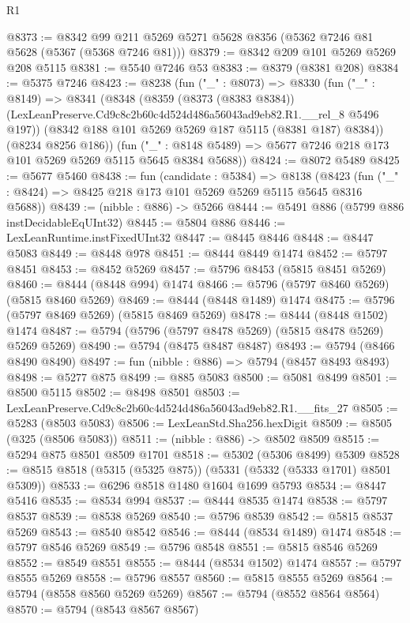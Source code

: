 \begin{lexlean}{R1}
\begin{coremodule}
@8373 := @8342 @99 @211 @5269 @5271 @5628 @8356 (@5362 @7246 @81 @5628 (@5367 (@5368 @7246 @81)))
@8379 := @8342 @209 @101 @5269 @5269 @208 @5115
@8381 := @5540 @7246 @53
@8383 := @8379 (@8381 @208)
@8384 := @5375 @7246
@8423 := @8238
    (fun ("_" : @8073) =>
    @8330
      (fun ("_" : @8149) =>
      @8341
        (@8348
          (@8359
            (@8373 (@8383 @8384))
            (LexLeanPreserve.Cd9c8c2b60c4d524d486a56043ad9eb82.R1.__rel_8 @5496 @197))
          (@8342 @188 @101 @5269 @5269 @187 @5115 (@8381 @187) @8384))
        (@8234 @8256 @186))
      (fun ("_" : @8148 @5489) => @5677 @7246 @218 @173 @101 @5269 @5269 @5115 @5645 @8384 @5688))
@8424 := @8072 @5489
@8425 := @5677 @5460
@8438 := fun (candidate : @5384) =>
  @8138 (@8423 (fun ("_" : @8424) => @8425 @218 @173 @101 @5269 @5269 @5115 @5645 @8316 @5688))
@8439 := (nibble : @886) -> @5266
@8444 := @5491 @886 (@5799 @886 instDecidableEqUInt32)
@8445 := @5804 @886
@8446 := LexLeanRuntime.instFixedUInt32
@8447 := @8445 @8446
@8448 := @8447 @5083
@8449 := @8448 @978
@8451 := @8444 @8449 @1474
@8452 := @5797 @8451
@8453 := @8452 @5269
@8457 := @5796 @8453 (@5815 @8451 @5269)
@8460 := @8444 (@8448 @994) @1474
@8466 := @5796 (@5797 @8460 @5269) (@5815 @8460 @5269)
@8469 := @8444 (@8448 @1489) @1474
@8475 := @5796 (@5797 @8469 @5269) (@5815 @8469 @5269)
@8478 := @8444 (@8448 @1502) @1474
@8487 := @5794 (@5796 (@5797 @8478 @5269) (@5815 @8478 @5269) @5269 @5269)
@8490 := @5794 (@8475 @8487 @8487)
@8493 := @5794 (@8466 @8490 @8490)
@8497 := fun (nibble : @886) => @5794 (@8457 @8493 @8493)
@8498 := @5277 @875
@8499 := @885 @5083
@8500 := @5081 @8499
@8501 := @8500 @5115
@8502 := @8498 @8501
@8503 := LexLeanPreserve.Cd9c8c2b60c4d524d486a56043ad9eb82.R1.__fits_27
@8505 := @5283 (@8503 @5083)
@8506 := LexLeanStd.Sha256.hexDigit
@8509 := @8505 (@325 (@8506 @5083))
@8511 := (nibble : @886) -> @8502 @8509
@8515 := @5294 @875 @8501 @8509 @1701
@8518 := @5302 (@5306 @8499) @5309
@8528 := @8515 @8518 (@5315 (@5325 @875)) (@5331 (@5332 (@5333 @1701) @8501 @5309))
@8533 := @6296 @8518 @1480 @1604 @1699 @5793
@8534 := @8447 @5416
@8535 := @8534 @994
@8537 := @8444 @8535 @1474
@8538 := @5797 @8537
@8539 := @8538 @5269
@8540 := @5796 @8539
@8542 := @5815 @8537 @5269
@8543 := @8540 @8542
@8546 := @8444 (@8534 @1489) @1474
@8548 := @5797 @8546 @5269
@8549 := @5796 @8548
@8551 := @5815 @8546 @5269
@8552 := @8549 @8551
@8555 := @8444 (@8534 @1502) @1474
@8557 := @5797 @8555 @5269
@8558 := @5796 @8557
@8560 := @5815 @8555 @5269
@8564 := @5794 (@8558 @8560 @5269 @5269)
@8567 := @5794 (@8552 @8564 @8564)
@8570 := @5794 (@8543 @8567 @8567)

\end{coremodule}
\end{lexlean}
